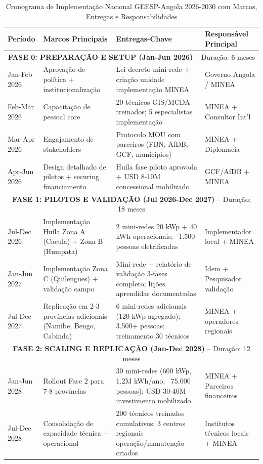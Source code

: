 \documentclass[12pt, a4paper]{article}
\begin{document}
\begin{table}[H]
\centering
\caption{Cronograma de Implementação Nacional GEESP-Angola 2026-2030 com Marcos, Entregas e Responsabilidades}
\label{tab:timeline_national}
\small
\begin{tabular}{|p{1.2cm}|p{3.2cm}|p{2.8cm}|p{2.5cm}|}
\hline
\textbf{Período} & \textbf{Marcos Principais} & \textbf{Entregas-Chave} & \textbf{Responsável Principal} \\
\hline
\multicolumn{4}{|c|}{\textbf{FASE 0: PREPARAÇÃO E SETUP (Jan-Jun 2026)} -- Duração: 6 meses} \\
\hline
Jan-Feb 2026 & Aprovação de política + institucionalização & Lei decreto mini-rede + criação unidade implementação MINEA & Governo Angola / MINEA \\
\hline
Feb-Mar 2026 & Capacitação de pessoal core & 20 técnicos GIS/MCDA treinados; 5 especialistas implementação & MINEA + Consultor Int'l \\
\hline
Mar-Apr 2026 & Engajamento de stakeholders & Protocolo MOU com parceiros (FBN, AfDB, GCF, municípios) & MINEA + Diplomacia \\
\hline
Apr-Jun 2026 & Design detalhado de pilotos + securing financiamento & Huíla fase piloto aprovada + USD 8-10M concessional mobilizado & GCF/AfDB + MINEA \\
\hline
\multicolumn{4}{|c|}{\textbf{FASE 1: PILOTOS E VALIDAÇÃO (Jul 2026-Dec 2027)} -- Duração: 18 meses} \\
\hline
Jul-Dec 2026 & Implementação Huíla Zona A (Cacula) + Zona B (Humpata) & 2 mini-redes 20 kWp + 40 kWh operacionais; ~1.500 pessoas eletrificadas & Implementador local + MINEA \\
\hline
Jan-Jun 2027 & Implementação Zona C (Quilengues) + validação campo & Mini-rede + relatório de validação 3-fases completo; lições aprendidas documentadas & Idem + Pesquisador validação \\
\hline
Jul-Dec 2027 & Replicação em 2-3 províncias adicionais (Namibe, Bengo, Cabinda) & 6 mini-redes adicionais (120 kWp agregado); 3.500+ pessoas; treinamento 30 técnicos & MINEA + operadores regionais \\
\hline
\multicolumn{4}{|c|}{\textbf{FASE 2: SCALING E REPLICAÇÃO (Jan-Dec 2028)} -- Duração: 12 meses} \\
\hline
Jan-Jun 2028 & Rollout Fase 2 para 7-8 províncias & 30 mini-redes (600 kWp, 1.2M kWh/ano, ~75.000 pessoas); USD 30-40M investimento mobilizado & MINEA + Parceiros financeiros \\
\hline
Jul-Dec 2028 & Consolidação de capacidade técnica + operacional & 200 técnicos treinados cumulativos; 3 centros regionais operação/manutenção criados & Institutos técnicos locais + MINEA \\

\end{tabular}
\end{table}
\end{document}
